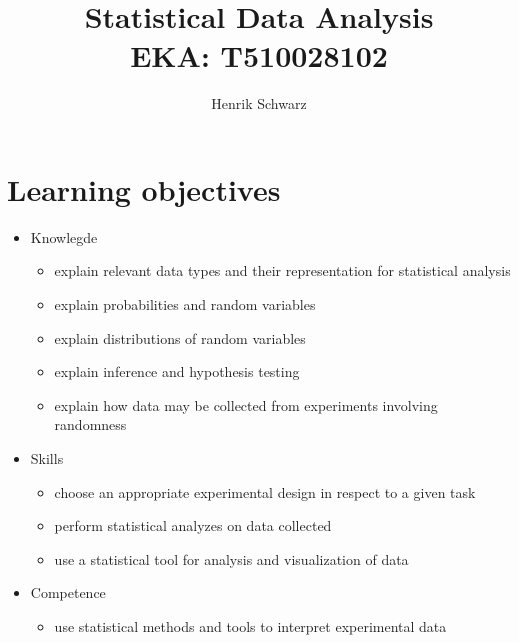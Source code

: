 \documentclass{article}
\author{Henrik Schwarz}
\title{Statistical Data Analysis \\ \small{EKA: T510028102}}
\date{}
\begin{document}
	\maketitle
\section*{Learning objectives}
\begin{itemize}
	\item Knowlegde
	\begin{itemize}
		\item explain relevant data types and their representation for statistical analysis
		\item explain probabilities and random variables
		\item explain distributions of random variables
		\item explain inference and hypothesis testing
		\item explain how data may be collected from experiments involving randomness 
	\end{itemize}
	\item Skills
	\begin{itemize}
		\item choose an appropriate experimental design in respect to a given task
		\item perform statistical analyzes on data collected
		\item use a statistical tool for analysis and visualization of data 
	\end{itemize}
	\item Competence
	\begin{itemize}
		\item use statistical methods and tools to interpret experimental data 
	\end{itemize}
\end{itemize}
\newpage
\end{document}
